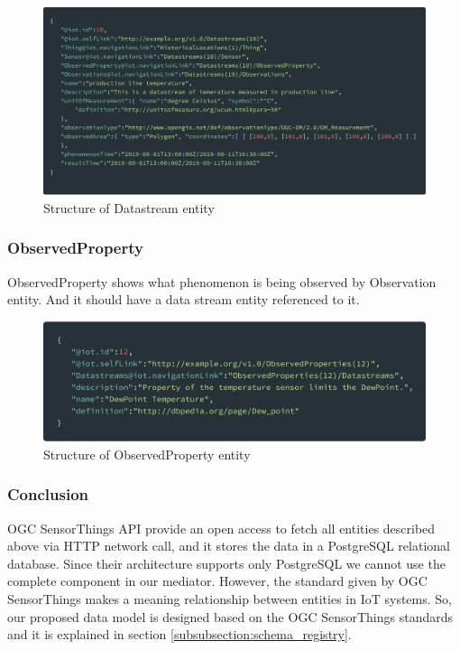 	\begin{figure}[!htbp] 
		\begin{center}
			\includegraphics[scale=0.1]{./images/png/ogc/datastream}	
			\caption{Structure of Datastream entity}	
			\label{fig:datastream}	
		\end{center}
	\end{figure}


	\subsubsection{ObservedProperty}
	ObservedProperty shows what phenomenon is being observed by Observation entity. And it should have a data stream entity referenced to it.
	
	\begin{figure}[!htbp] 
		\begin{center}
			\includegraphics[scale=0.1]{./images/png/ogc/observedproperty}	
			\caption{Structure of ObservedProperty entity}	
			\label{fig:observedproperty}	
		\end{center}
	\end{figure}

	\subsubsection{Conclusion}
	OGC SensorThings API provide an open access to fetch all entities described above via HTTP network call, and it stores the data in a PostgreSQL relational database. Since their architecture supports only PostgreSQL we cannot use the complete component in our mediator. However, the standard given by OGC SensorThings makes a meaning relationship between entities in IoT systems. So, our proposed data model is designed based on the OGC SensorThings standards and it is explained in section \ref{subsubsection:schema_registry}. 

